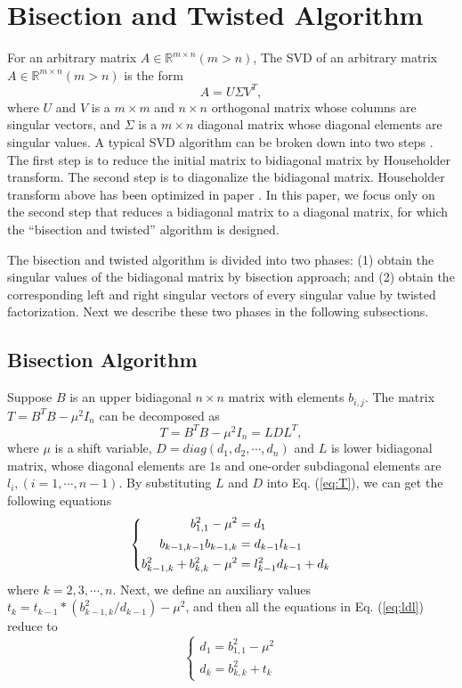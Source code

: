 \section{Bisection and Twisted Algorithm} \label{sec:algorithm}
For an arbitrary matrix $A\in \mathbb{R}^{m \times n} (m>n)$,
The SVD of an arbitrary matrix $A\in \mathbb{R}^{m \times n} (m>n)$ is the form 
\[A = U \Sigma V^T,\] where $U$ and $V$ is a $m \times m$ and $n \times n$ orthogonal matrix whose columns are singular vectors, and $\Sigma$ is a $m\times n$ diagonal matrix whose diagonal elements are singular values.
A typical SVD algorithm can be broken down into two steps \cite{65SIAM}.
The first step is to reduce the initial matrix to bidiagonal matrix by Householder transform.
The second step is to diagonalize the bidiagonal matrix.
Householder transform above has been optimized in paper \cite{LiuHouseholder}.
In this paper, we focus only on the second step that reduces a bidiagonal matrix to a diagonal matrix, for which the ``bisection and twisted'' algorithm is designed.
 
The bisection and twisted algorithm is divided into two phases:
(1) obtain the singular values of the bidiagonal matrix by bisection approach; and
(2) obtain the corresponding left and right singular vectors of every singular value by twisted factorization.
Next we describe these two phases in the following subsections.

\subsection{Bisection Algorithm}\label{subsec:bisection}
Suppose $B$ is an upper bidiagonal $n \times n$ matrix with elements $b_{i,j}$.
The matrix $T = B^T B - \mu^2 I_n$ can be decomposed as
\begin{equation}
T = B^T B - \mu^2 I_n = L D L^T ,
\label{eq:T}
\end{equation}
where $\mu$ is a shift variable, $D=diag(d_1,d_2,\cdots,d_n)$ and $L$ is lower bidiagonal matrix, whose diagonal elements are $1$s and one-order subdiagonal elements are $l_{i}, (i=1,\cdots,n-1)$.
By substituting $L$ and $D$ into Eq. (\ref{eq:T}), we can get the following equations
\[
\left \{ \begin{aligned}
b_{1,1}^2 - \mu^2 &= d_1\\
b_{k-1,k-1} b_{k-1,k} &= d_{k-1} l_{k-1}\\
b_{k-1,k}^2 + b_{k,k}^2 - \mu^2 &= l_{k-1}^2 d_{k-1} + d_k
\vspace{-0.05in}
\end{aligned} \right .
\label{eq:ldl} \]
where $k = 2,3,\cdots,n$.
Next, we define an auxiliary values $t_{k} = t_{k-1} * (b_{k-1,k}^2 / d_{k-1}) - \mu^2$, and then all the equations in Eq. (\ref{eq:ldl}) reduce to
\begin{equation}
\left \{
\begin{aligned}
d_1 = b_{1,1}^2 - \mu^2 \\
d_k = b_{k,k}^2 + t_{k}
\end{aligned}
\right .
\label{eq:negcount}
\end{equation}

